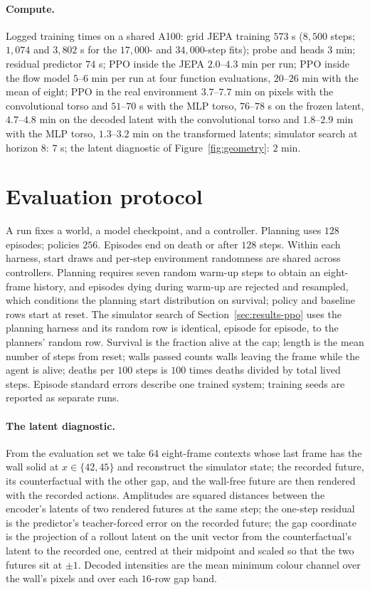 \paragraph{Compute.} Logged training times on a shared A100: grid JEPA training $573$ s ($8{,}500$
steps; $1{,}074$ and $3{,}802$ s for the $17{,}000$- and $34{,}000$-step fits); probe and heads $3$
min; residual predictor $74$ s; PPO inside the JEPA $2.0$--$4.3$ min per run; PPO inside the flow model
$5$--$6$ min per run at four function evaluations, $20$--$26$ min with the mean of eight; PPO in the real environment $3.7$--$7.7$ min on pixels with the convolutional torso and $51$--$70$ s with the MLP torso, $76$--$78$ s on the frozen latent, $4.7$--$4.8$ min on the decoded latent with the convolutional torso and $1.8$--$2.9$ min with the MLP torso, $1.3$--$3.2$ min on the transformed latents; simulator search at horizon
$8$: $7$ s; the latent diagnostic of Figure~\ref{fig:geometry}: $2$ min.

\section{Evaluation protocol}
\label{app:protocol}

A run fixes a world, a model checkpoint, and a controller. Planning uses $128$ episodes; policies
$256$. Episodes end on death or after $128$ steps. Within each harness, start draws and per-step
environment randomness are shared across controllers. Planning requires seven random warm-up steps to
obtain an eight-frame history, and episodes dying during warm-up are rejected and resampled, which
conditions the planning start distribution on survival; policy and baseline rows start at reset. The
simulator search of Section~\ref{sec:results-ppo} uses the planning harness and its random row is
identical, episode for episode, to the planners' random row. Survival is the fraction alive at the
cap; length is the mean number of steps from reset; walls passed counts walls leaving the frame while
the agent is alive; deaths per $100$ steps is $100$ times deaths divided by total lived steps. Episode
standard errors describe one trained system; training seeds are reported as separate runs.

\paragraph{The latent diagnostic.} From the evaluation set we take $64$ eight-frame contexts whose
last frame has the wall solid at $x\in\{42,45\}$ and reconstruct the simulator state; the recorded
future, its counterfactual with the other gap, and the wall-free future are then rendered with the
recorded actions. Amplitudes are squared distances between the encoder's latents of two rendered
futures at the same step; the one-step residual is the predictor's teacher-forced error on the
recorded future; the gap coordinate is the projection of a rollout latent on the unit vector from the
counterfactual's latent to the recorded one, centred at their midpoint and scaled so that the two
futures sit at $\pm1$. Decoded intensities are the mean minimum colour channel over the wall's pixels
and over each $16$-row gap band.

